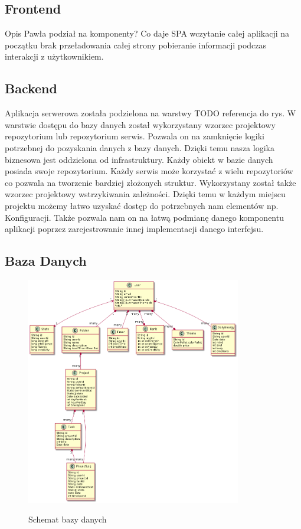 \documentclass[a4paper,11pt]{report}
\begin{document}
\subsection{Frontend} 
Opis Pawła podział na komponenty?
Co daje SPA wczytanie całej aplikacji na początku brak przeładowania całej strony pobieranie informacji podczas interakcji z użytkownikiem. 
\subsection{Backend}
Aplikacja serwerowa została podzielona na warstwy TODO referencja do rys.
W warstwie dostępu do bazy danych został wykorzystany wzorzec projektowy repozytorium lub repozytorium serwis.
Pozwala on na zamknięcie logiki potrzebnej do pozyskania danych z bazy danych.
Dzięki temu nasza logika biznesowa jest oddzielona od infrastruktury.
Każdy obiekt w bazie danych posiada swoje repozytorium.
Każdy serwis może korzystać z wielu repozytoriów co pozwala na tworzenie bardziej złożonych struktur.
Wykorzystany został także wzorzec projektowy wstrzykiwania zależności.
Dzięki temu w każdym miejscu projektu możemy łatwo uzyskać dostęp do potrzebnych nam elementów np. Konfiguracji.
Także pozwala nam on na łatwą podmianę danego komponentu aplikacji poprzez zarejestrowanie innej implementacji danego interfejsu.

\subsection{Baza Danych}
\begin{figure}[h]
	\centering
	\includegraphics[width=\textwidth, height=10cm]{gamitude_database_model}\\
	\caption{Schemat bazy danych}
	\label{fig:db}
\end{figure}
\end{document}
